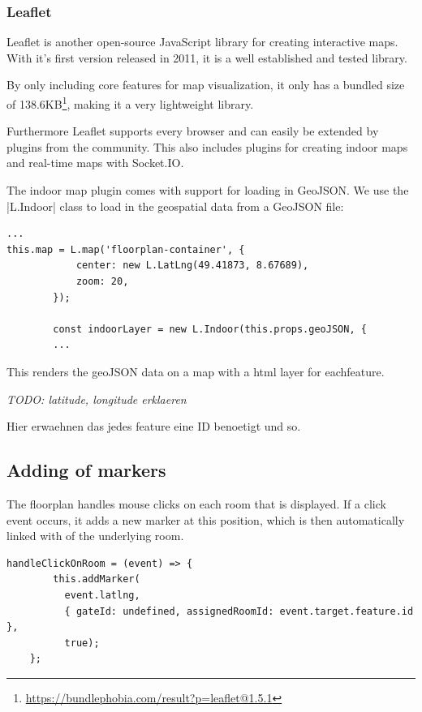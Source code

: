 \subsubsection{Leaflet}
\label{Leaflet}

Leaflet is another open-source JavaScript library for creating interactive maps. With it's first version released in 2011, it is a well established and tested library. 

By only including core features for map visualization, it only has a bundled size of 138.6KB\footnote{\url{https://bundlephobia.com/result?p=leaflet@1.5.1}}, making it a very lightweight library.

Furthermore Leaflet supports every browser and can easily be extended by plugins from the community.
This also includes plugins for creating indoor maps and real-time maps with Socket.IO. 

The indoor map plugin comes with support for loading in GeoJSON. We use the |L.Indoor| class to load in the geospatial data from a GeoJSON file:

\begin{lstlisting}[label=setupMap]
...
this.map = L.map('floorplan-container', {
            center: new L.LatLng(49.41873, 8.67689),
            zoom: 20,
        });

        const indoorLayer = new L.Indoor(this.props.geoJSON, {
        ...
\end{lstlisting}

This renders the geoJSON data on a map with a html layer for eachfeature.

\emph{TODO: latitude, longitude erklaeren}



Hier erwaehnen das jedes feature eine ID benoetigt und so.

\subsection{Adding of markers}
\label{Adding of markers}

The floorplan handles mouse clicks on each room that is displayed. If a click event occurs, it adds a new marker at this position, which is then automatically linked with of the underlying room.

\begin{lstlisting}[label=addMarkers]
handleClickOnRoom = (event) => {
        this.addMarker(
          event.latlng, 
          { gateId: undefined, assignedRoomId: event.target.feature.id }, 
          true);
    };
\end{lstlisting}

